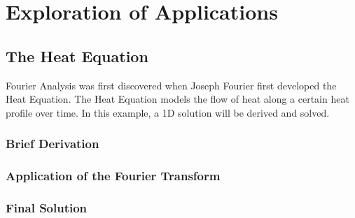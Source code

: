\section{Exploration of Applications}
\subsection{The Heat Equation}
Fourier Analysis was first discovered when Joseph Fourier first developed the Heat Equation. The Heat Equation models the flow of heat along a certain heat profile over time. In this example, a 1D solution will be derived and solved.

\subsubsection{Brief Derivation}

\subsubsection{Application of the Fourier Transform}

\subsubsection{Final Solution}
